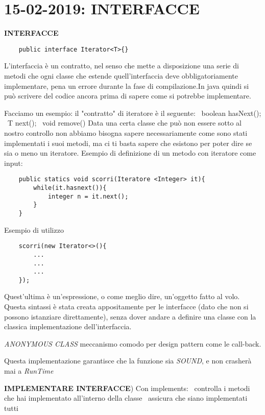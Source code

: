 
 
\newpage
\section{15-02-2019: INTERFACCE}
\textbf{INTERFACCE}
\begin{lstlisting}
	public interface Iterator<T>{}
\end{lstlisting}
L'interfaccia è un contratto, nel senso che mette a disposizione una serie di metodi che ogni classe che estende quell'interfaccia deve obbligatoriamente implementare, pena un errore durante la fase di compilazione.In java quindi si può scrivere del codice ancora prima di sapere come si potrebbe implementare.

\noindent Facciamo un esempio: il "contratto" di iteratore è il seguente: \newline
\textbullet\ boolean hasNext(); \newline
\textbullet\ T next(); \newline
\textbullet\ void remove()\newline
Data una certa classe che può non essere sotto al nostro controllo non abbiamo bisogna sapere necessariamente come sono stati implementati i suoi metodi, ma ci ti basta sapere che esistono per poter dire se sia o meno un iteratore. \newline
Esempio di definizione di un metodo con iteratore come input: 
\begin{lstlisting}
	public statics void scorri(Iteratore <Integer> it){
		while(it.hasnext()){
			integer n = it.next();
		}
	}
\end{lstlisting}
Esempio di utilizzo 
\begin{lstlisting}
	scorri(new Iterator<>(){
		...
		...
		...
	});
\end{lstlisting}
Quest'ultima è un'espressione, o come meglio dire, un'oggetto fatto al volo. Questa sintassi è stata creata appositamente per le interfacce (dato che non si possono istanziare direttamente), senza dover andare a definire una classe con la classica implementazione dell'interfaccia. 

\noindent \textit{ANONYMOUS CLASS} meccanismo comodo per design pattern come le call-back. 

\noindent Questa implementazione garantisce che la funzione sia \textit{SOUND}, e non crasherà mai a \textit{RunTime}

\noindent \textbf{IMPLEMENTARE INTERFACCE}) Con implements: \newline
\textbullet\ controlla i metodi che hai implementato all'interno della classe \newline
\textbullet\ assicura che siano implementati tutti 

